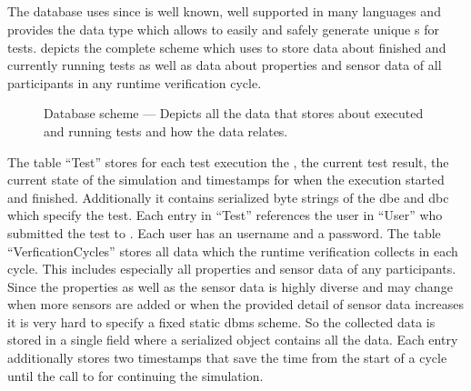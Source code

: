 \subsection{\texorpdfstring{}{DBMS}}
The database uses \postgresql{} since \postgresql{} is well known, well supported in many languages and provides the data type  which allows to easily and safely generate unique \unskip{}s for tests.
 depicts the complete scheme which \drivebuild{} uses to store data about finished and currently running tests as well as data about properties and sensor data of all participants in any runtime verification cycle.
\begin{figure}
    \centering
    
    \medskip
    \caption{%
        Database scheme --- Depicts all the data that \drivebuild{} stores about executed and running tests and how the data relates.
    }\label{fig:databaseScheme}
\end{figure}
The table \enquote{Test} stores for each test execution the , the current test result, the current state of the simulation and timestamps for when the execution started and finished.
Additionally it contains serialized byte strings of the \gls{dbe} and \gls{dbc} which specify the test.
Each entry in \enquote{Test} references the user in \enquote{User} who submitted the test to \drivebuild{}.
Each user has an username and a password.
The table \enquote{VerficationCycles} stores all data which the runtime verification collects in each cycle.
This includes especially all properties and sensor data of any participants.
Since the properties as well as the sensor data is highly diverse and may change when more sensors are added or when the provided detail of sensor data increases it is very hard to specify a fixed static \gls{dbms} scheme.
So the collected data is stored in a single field where a serialized  object contains all the data.
Each entry additionally stores two timestamps that save the time from the start of a cycle until the call to \beamng{} for continuing the simulation.
